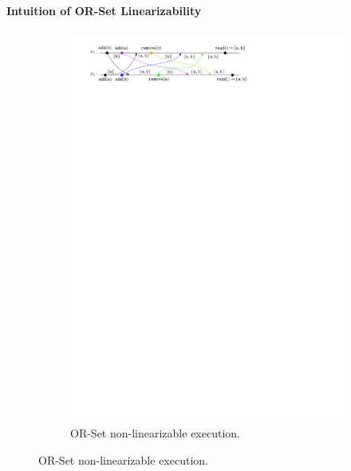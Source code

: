 \paragraph{Intuition of OR-Set Linearizability}

\begin{figure}[t]
  \begin{subfigure}{1.0\linewidth}
    \centering
    \includegraphics[width=0.70 \textwidth]{./figures/OR-Set-weird}
    \caption{OR-Set non-linearizable execution.}
    \label{fig:or-set-not-lin}
  \end{subfigure}
  \bigskip
  \bigskip


\end{figure}
